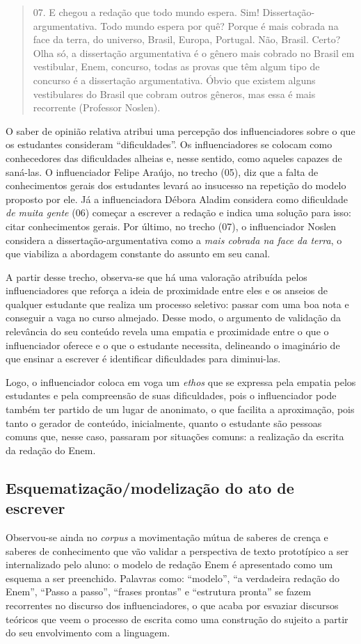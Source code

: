 \documentclass[portuguese]{textolivre}
\begin{document}
\begin{quote}
  07. E chegou a redação que todo mundo espera. Sim! Dissertação-argumentativa. Todo mundo espera por quê? Porque é mais cobrada na face da terra, do universo, Brasil, Europa, Portugal. Não, Brasil. Certo? Olha só, a dissertação argumentativa é o gênero mais cobrado no Brasil em vestibular, Enem, concurso, todas as provas que têm algum tipo de concurso é a dissertação argumentativa. Óbvio que existem alguns vestibulares do Brasil que cobram outros gêneros, mas essa é mais recorrente (Professor Noslen). 
\end{quote}

O saber de opinião relativa atribui uma percepção dos influenciadores sobre o que os estudantes consideram “dificuldades”. Os influenciadores se colocam como conhecedores das dificuldades alheias e, nesse sentido, como aqueles capazes de saná-las. O influenciador Felipe Araújo, no trecho (05), diz que a falta de conhecimentos gerais dos estudantes levará ao insucesso na repetição do modelo proposto por ele. Já a influenciadora Débora Aladim considera como dificuldade \textit{de muita gente} (06) começar a escrever a redação e indica uma solução para isso: citar conhecimentos gerais. Por último, no trecho (07), o influenciador Noslen considera a dissertação-argumentativa como a\textit{ mais cobrada na face da terra}, o que viabiliza a abordagem constante do assunto em seu canal. 

A partir desse trecho, observa-se que há uma valoração atribuída pelos influenciadores que reforça a ideia de proximidade entre eles e os anseios de qualquer estudante que realiza um processo seletivo: passar com uma boa nota e conseguir a vaga no curso almejado. Desse modo, o argumento de validação da relevância do seu conteúdo revela uma empatia e proximidade entre o que o influenciador oferece e o que o estudante necessita, delineando o imaginário de que ensinar a escrever é identificar dificuldades para diminui-las. 

Logo, o influenciador coloca em voga um \textit{ethos} que se expressa pela empatia pelos estudantes e pela compreensão de suas dificuldades, pois o influenciador pode também ter partido de um lugar de anonimato, o que facilita a aproximação, pois tanto o gerador de conteúdo, inicialmente, quanto o estudante são pessoas comuns que, nesse caso, passaram por situações comuns: a realização da escrita da redação do Enem.

\subsection{Esquematização/modelização do ato de escrever}\label{sec-titulo}
Observou-se ainda no \textit{corpus} a movimentação mútua de saberes de crença e saberes de conhecimento que vão validar a perspectiva de texto prototípico a ser internalizado pelo aluno: o modelo de redação Enem é apresentado como um esquema a ser preenchido. Palavras como: “modelo”, “a verdadeira redação do Enem”, “Passo a passo”, “frases prontas” e “estrutura pronta” se fazem recorrentes no discurso dos influenciadores, o que acaba por esvaziar discursos teóricos que veem o processo de escrita como uma construção do sujeito a partir do seu envolvimento com a linguagem. 
\end{document}
